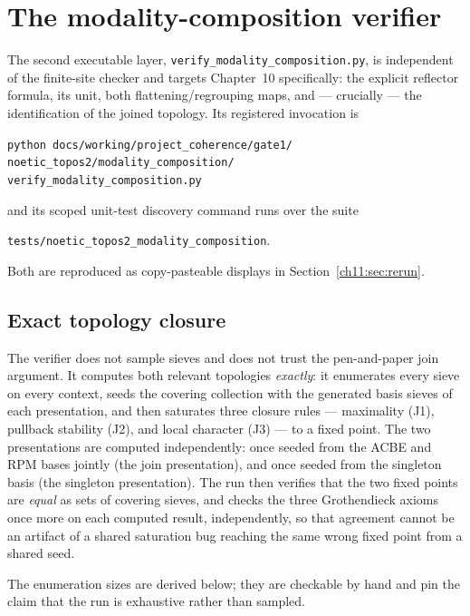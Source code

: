 \section{The modality-composition verifier}
\label{ch11:sec:composition}

The second executable layer,
\texttt{verify\_modality\_composition.py}, is
independent of the finite-site checker and targets Chapter~10 specifically:
the explicit reflector formula, its unit, both flattening/regrouping maps,
and --- crucially --- the identification of the joined topology. Its
registered invocation is
\begin{center}
\texttt{python docs/working/project\_coherence/gate1/}\\
\texttt{noetic\_topos2/modality\_composition/}\\
\texttt{verify\_modality\_composition.py}
\end{center}
\noindent and its scoped unit-test discovery command runs over the suite
\begin{center}
\texttt{tests/noetic\_topos2\_modality\_composition}.
\end{center}
\noindent Both are reproduced as copy-pasteable displays in
Section~\ref{ch11:sec:rerun}.

\subsection{Exact topology closure}
\label{ch11:sec:closure}

The verifier does not sample sieves and does not trust the pen-and-paper join
argument. It computes both relevant topologies \emph{exactly}: it enumerates
every sieve on every context, seeds the covering collection with the
generated basis sieves of each presentation, and then saturates three
closure rules --- maximality (J1), pullback stability (J2), and local
character (J3) --- to a fixed point. The two presentations are computed
independently: once seeded from the ACBE and RPM bases jointly (the join
presentation), and once seeded from the singleton basis (the singleton
presentation). The run then verifies that the two fixed points are
\emph{equal} as sets of covering sieves, and checks the three Grothendieck
axioms once more on each computed result, independently, so that agreement
cannot be an artifact of a shared saturation bug reaching the same wrong
fixed point from a shared seed.

The enumeration sizes are derived below; they are checkable by hand and pin
the claim that the run is exhaustive rather than sampled.

